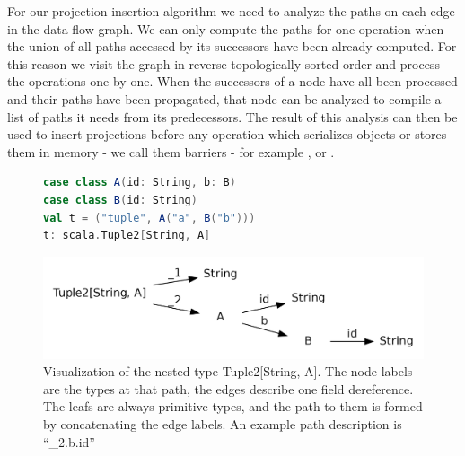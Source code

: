 For our projection insertion algorithm we need to analyze the paths on each edge in the data flow graph. We can only compute the paths for one operation when the union of all paths accessed by its successors have been already computed. For this reason we visit the graph in reverse topologically sorted order and process the operations one by one. When the successors of a node have all been processed and their paths have been propagated, that node can be analyzed to compile a list of paths it needs from its predecessors. The result of this analysis can then be used to insert projections before any operation which serializes objects or stores them in memory - we call them barriers - for example ,  or .

\begin{figure}
\begin{lstlisting}[language=Scala,name=code, caption=Nested type for paths example., captionpos=b, label=lst:types]
case class A(id: String, b: B)
case class B(id: String)  
val t = ("tuple", A("a", B("b"))) 
t: scala.Tuple2[String, A]
\end{lstlisting}
\centering
\includegraphics[clip=true, width=0.95\columnwidth]{dot/access.png}
\caption{Visualization of the nested type Tuple2[String, A]. The node labels are the types at that path, the edges describe one field dereference. The leafs are always primitive types, and the path to them is formed by concatenating the edge labels. An example path description is ``\_2.b.id''}
\label{fig:type_tree}
\end{figure}


